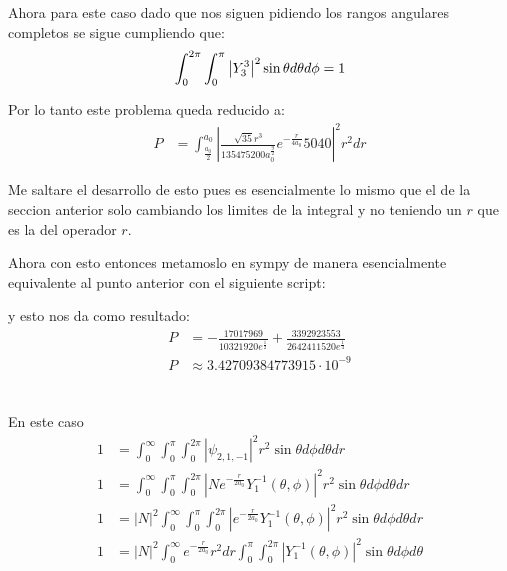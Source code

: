 \documentclass{report}
\begin{document}
Ahora para este caso dado que nos siguen pidiendo los rangos angulares completos se sigue cumpliendo que: \[
	\int_0^{2\pi} \int_0^\pi \left| Y_{3}^3 \right|^2 \sin\theta d\theta d\phi = 1\\
\]

Por lo tanto este problema queda reducido a:
\begin{align*}
	P &= \int_{\frac{a_0}{2}}^{a_0} \left|\frac{\sqrt{35} r^{3}}{135475200 a_{0}^{\frac{9}{2}}} e^{- \frac{r}{4 a_0}} 5040 \right|^2 r^2 dr
\end{align*}

Me saltare el desarrollo de esto pues es esencialmente lo mismo que el de la seccion anterior solo cambiando los limites de la integral y no teniendo un $r$ que es la del operador $r$.

Ahora con esto entonces metamoslo en sympy de manera esencialmente equivalente al punto anterior con el siguiente script:


y esto nos da como resultado:
\begin{align*}
	P &= - \frac{17017969}{10321920 e^{\frac{1}{2}}} + \frac{3392923553}{2642411520 e^{\frac{1}{4}}}\\
	P &\approx 3.42709384773915 \cdot 10^{-9}
\end{align*}


\chapter{}


\chapter{}

\section{}

En este caso
\begin{align*}
	1 &= \int_0^{\infty} \int_0^\pi \int_0^{2\pi} \left| \psi_{2, 1, -1} \right|^2 r^2 \sin\theta d\phi d\theta dr\\
	1 &= \int_0^{\infty} \int_0^\pi \int_0^{2\pi} \left| N e^{-\frac{r}{2 a_0}} Y_1^{-1}\left( \theta, \phi \right) \right|^2 r^2 \sin\theta d\phi d\theta dr\\
	1 &= |N|^2 \int_0^{\infty} \int_0^\pi \int_0^{2\pi} \left| e^{-\frac{r}{2 a_0}} Y_1^{-1}\left( \theta, \phi \right) \right|^2 r^2 \sin\theta d\phi d\theta dr\\
	1 &= |N|^2 \int_0^{\infty} e^{-\frac{r}{2 a_0}} r^2  dr \int_0^\pi \int_0^{2\pi} \left|  Y_1^{-1}\left( \theta, \phi \right) \right|^2 \sin\theta d\phi d\theta
\end{align*}
\end{document}
